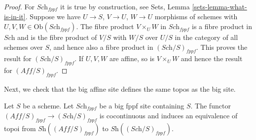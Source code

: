\begin{proof}
For $\textit{Sch}_{fppf}$ it is true by construction, see
Sets, Lemma \ref{sets-lemma-what-is-in-it}.
Suppose we have $U \to S$, $V \to U$, $W \to U$ morphisms
of schemes with $U, V, W \in \text{Ob}(\textit{Sch}_{fppf})$.
The fibre product $V \times_U W$ in $\textit{Sch}_{fppf}$
is a fibre product in $\textit{Sch}$ and
is the fibre product of $V/S$ with $W/S$ over $U/S$ in
the category of all schemes over $S$, and hence also a
fibre product in $(\textit{Sch}/S)_{fppf}$.
This proves the result for $(\textit{Sch}/S)_{fppf}$.
If $U, V, W$ are affine, so is $V \times_U W$ and hence the
result for $(\textit{Aff}/S)_{fppf}$.
\end{proof}

\noindent
Next, we check that the big affine site defines the same
topos as the big site.

\begin{lemma}
\label{lemma-affine-big-site-fppf}
Let $S$ be a scheme. Let $\textit{Sch}_{fppf}$ be a big fppf
site containing $S$.
The functor $(\textit{Aff}/S)_{fppf} \to (\textit{Sch}/S)_{fppf}$
is cocontinuous and induces an equivalence of topoi from
$\textit{Sh}((\textit{Aff}/S)_{fppf})$ to
$\textit{Sh}((\textit{Sch}/S)_{fppf})$.
\end{lemma}

